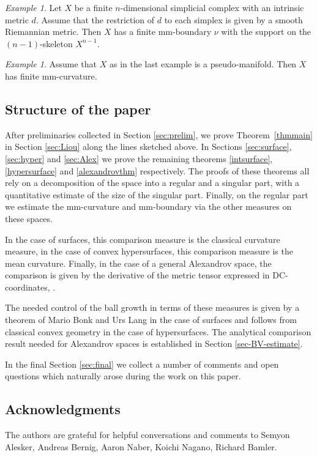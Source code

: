 \documentclass[12pt,leqno,intlimits]{amsart}
\numberwithin{equation}{section}
\theoremstyle{definition}
\theoremstyle{remark}
\newtheorem{ex}[thm]{Example}
\newcommand{\tref}[1]{Theorem~\ref{#1}}
\begin{document}
\begin{ex} \label{ex:secondlast}
Let $X$ be a finite $n$-dimensional simplicial complex with an intrinsic metric $d$.
Assume that the restriction of $d$ to each simplex is given by a smooth Riemannian metric.
Then $X$ has a finite mm-boundary $\nu$ with the support on the $(n-1)$-skeleton $X^{n-1}$.
\end{ex}

\begin{ex} \label{ex:last}
Assume that $X$ as in the last example is a pseudo-manifold.
Then $X$ has finite mm-curvature.
\end{ex}

\subsection{Structure of the paper}
After preliminaries collected in Section \ref{sec:prelim}, we prove \tref{thmmain} in Section \ref{sec:Liou} along the lines sketched above.
In Sections \ref{sec:surface}, \ref{sec:hyper} and \ref{sec:Alex} we prove the remaining theorems \ref{intsurface}, \ref{hypersurface} and \ref{alexandrovthm} respectively.
The proofs of these theorems all rely on a decomposition of the space into a regular and a singular part, with a quantitative estimate of the size of the singular part.
Finally, on the regular part we estimate the mm-curvature and mm-boundary via the other measures on these spaces.

In the case of surfaces, this comparison measure is the classical curvature measure, in the case of convex hypersurfaces, this comparison measure is the mean curvature.
Finally, in the case of a general Alexandrov space, the comparison is given by the derivative of the metric tensor expressed in DC-coordinates, \cite{Per-DC}.

The needed control of the ball growth in terms of these measures is given by a theorem of Mario  Bonk and Urs Lang in the case of surfaces and follows from classical convex geometry in the case of hypersurfaces.
The analytical comparison result needed for Alexandrov spaces is established in Section \ref{sec-BV-estimate}.

In the final Section \ref{sec:final} we collect a number of comments and open questions which naturally arose during the work on this paper.

\subsection{Acknowledgments} The authors are grateful for helpful conversations and comments to Semyon Alesker, Andreas Bernig, Aaron Naber, Koichi Nagano, Richard Bamler.
\end{document}
